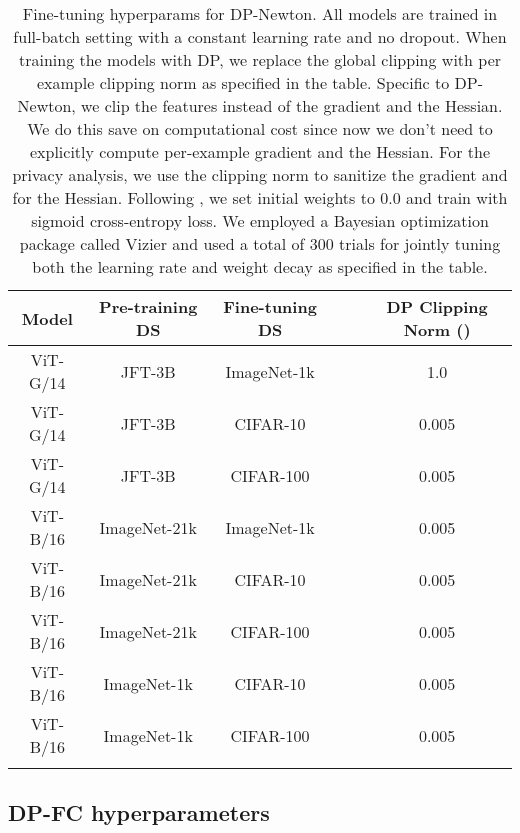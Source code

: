 \documentclass[letterpaper]{article} \usepackage{fullpage}
\begin{document}
\begin{table}[H]
    \centering
\label{tab:hparams_lamb}
    \begin{tabular}{cccccc}
    \toprule
        Model & Pre-training DS & Fine-tuning DS &  &  & DP Clipping Norm ()  \\
        \midrule
      ViT-G/14 & JFT-3B & ImageNet-1k &  &  & 1.0 \\
      ViT-G/14 & JFT-3B & CIFAR-10 &  &  & 0.005 \\
      ViT-G/14 & JFT-3B & CIFAR-100 &  &  & 0.005 \\
      ViT-B/16 & ImageNet-21k & ImageNet-1k &  &  & 0.005 \\
      ViT-B/16 & ImageNet-21k & CIFAR-10 &  &  & 0.005 \\
      ViT-B/16 & ImageNet-21k & CIFAR-100 &  &  & 0.005 \\
           ViT-B/16 & ImageNet-1k & CIFAR-10 &  &  & 0.005 \\
      ViT-B/16 & ImageNet-1k & CIFAR-100 &  &  & 0.005 \\
         \bottomrule
         \addlinespace[0.3cm]
    \end{tabular}
        \caption{Fine-tuning hyperparams for DP-Newton. All models are trained in full-batch setting with a constant learning rate and no dropout. When training the models with DP, we replace the global clipping with per example clipping norm as specified in the table. Specific to DP-Newton, we clip the features instead of the gradient and the Hessian. We do this save on computational cost since now we don't need to explicitly compute per-example gradient and the Hessian. For the privacy analysis, we use the clipping norm  to sanitize the gradient and  for the Hessian. Following \cite{mehta2022large}, we set initial weights to 0.0 and train with sigmoid cross-entropy loss. We employed a Bayesian optimization package called Vizier \citep{vizier, oss_vizier} and used a total of 300 trials for jointly tuning both the learning rate and weight decay as specified in the table.}
\end{table}

\subsection{DP-FC hyperparameters}
\end{document}
